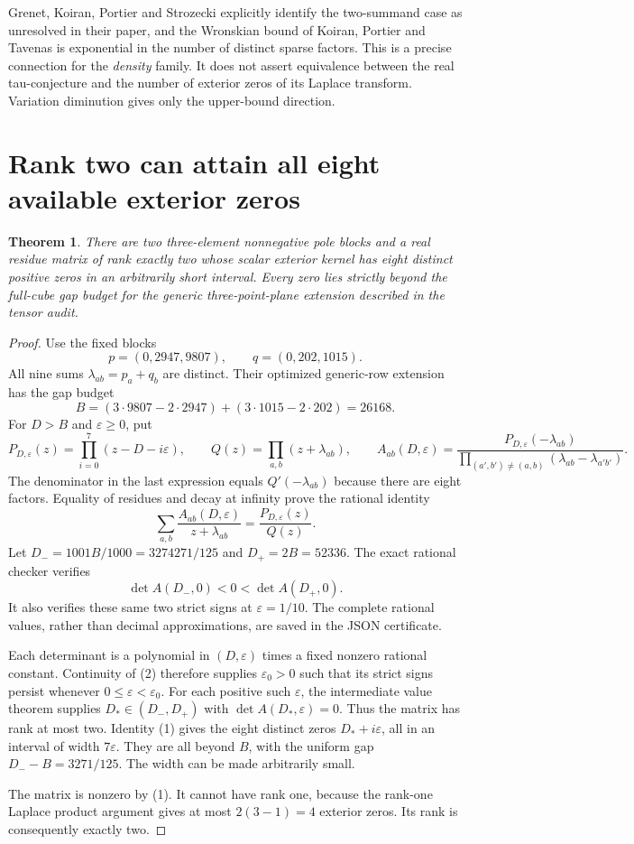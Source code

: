\documentclass{article}
\newtheorem{theorem}{Theorem}
\begin{document}
Grenet, Koiran, Portier and Strozecki explicitly identify the
two-summand case as unresolved in their paper, and the Wronskian
bound of Koiran, Portier and Tavenas is exponential in the number of
distinct sparse factors.  This is a precise connection for the
\emph{density} family.  It does not assert equivalence between the
real tau-conjecture and the number of exterior zeros of its Laplace
transform.  Variation diminution gives only the upper-bound direction.

\section{Rank two can attain all eight available exterior zeros}

\begin{theorem}
There are two three-element nonnegative pole blocks and a real residue
matrix of rank exactly two whose scalar exterior kernel has eight
distinct positive zeros in an arbitrarily short interval.  Every zero
lies strictly beyond the full-cube gap budget for the generic
three-point-plane extension described in the tensor audit.
\end{theorem}
\begin{proof}
Use the fixed blocks
\[
 p=(0,2947,9807),\qquad q=(0,202,1015).
\]
All nine sums $\lambda_{ab}=p_a+q_b$ are distinct.  Their optimized
generic-row extension has the gap budget
\[
 B=(3\cdot9807-2\cdot2947)+(3\cdot1015-2\cdot202)=26168.
\]
For $D>B$ and $\varepsilon\geq0$, put
\[
 P_{D,\varepsilon}(z)=\prod_{i=0}^7(z-D-i\varepsilon),
 \qquad Q(z)=\prod_{a,b}(z+\lambda_{ab}),
 \qquad
 A_{ab}(D,\varepsilon)=
 \frac{P_{D,\varepsilon}(-\lambda_{ab})}
 {\prod_{(a',b')\ne(a,b)}(\lambda_{ab}-\lambda_{a'b'})}.
\]
The denominator in the last expression equals $Q'(-\lambda_{ab})$
because there are eight factors.  Equality of residues and decay at
infinity prove the rational identity
\[
 \sum_{a,b}\frac{A_{ab}(D,\varepsilon)}{z+\lambda_{ab}}
 =\frac{P_{D,\varepsilon}(z)}{Q(z)}.
 \tag{1}
\]
Let $D_-=1001B/1000=3274271/125$ and $D_+=2B=52336$.
The exact rational checker verifies
\[
 \det A(D_-,0)<0<\det A(D_+,0).
 \tag{2}
\]
It also verifies these same two strict signs at $\varepsilon=1/10$.
The complete rational values, rather than decimal approximations,
are saved in the JSON certificate.

Each determinant is a polynomial in $(D,\varepsilon)$ times a fixed
nonzero rational constant.  Continuity of (2) therefore supplies
$\varepsilon_0>0$ such that its strict signs persist whenever
$0\leq\varepsilon<\varepsilon_0$.  For each positive such
$\varepsilon$, the intermediate value theorem supplies
$D_*\in(D_-,D_+)$ with $\det A(D_*,\varepsilon)=0$.
Thus the matrix has rank at most two.  Identity (1) gives the eight
distinct zeros $D_*+i\varepsilon$, all in an interval of width
$7\varepsilon$.  They are all beyond $B$, with the uniform gap
$D_--B=3271/125$.  The width can be made arbitrarily small.

The matrix is nonzero by (1).  It cannot have rank one, because the
rank-one Laplace product argument gives at most $2(3-1)=4$ exterior
zeros.  Its rank is consequently exactly two.
\end{proof}
\end{document}
